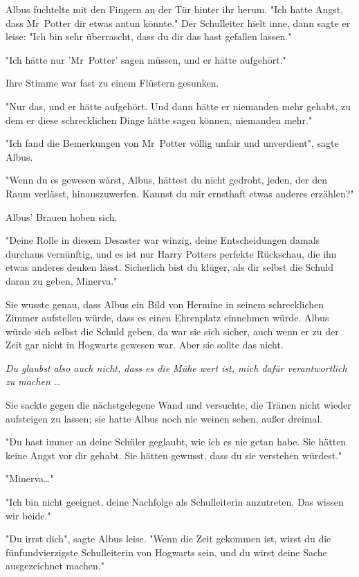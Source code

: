 {Albus fuchtelte mit den Fingern an der Tür hinter ihr herum. "Ich hatte Angst, dass Mr~Potter dir etwas antun könnte." Der Schulleiter hielt inne, dann sagte er leise: "Ich bin sehr überrascht, dass du dir das hast gefallen lassen."

"Ich hätte nur 'Mr~Potter' sagen müssen, und er hätte aufgehört."

Ihre Stimme war fast zu einem Flüstern gesunken.

"Nur das, und er hätte aufgehört. Und dann hätte er niemanden mehr gehabt, zu dem er diese schrecklichen Dinge hätte sagen können, niemanden mehr."

"Ich fand die Bemerkungen von Mr~Potter völlig unfair und unverdient", sagte Albus.

"Wenn du es gewesen wärst, Albus, hättest du nicht gedroht, jeden, der den Raum verlässt, hinauszuwerfen. Kannst du mir ernsthaft etwas anderes erzählen?"

Albus' Brauen hoben sich.

"Deine Rolle in diesem Desaster war winzig, deine Entscheidungen damals durchaus vernünftig, und es ist nur Harry Potters perfekte Rückschau, die ihn etwas anderes denken lässt. Sicherlich bist du klüger, als dir selbst die Schuld daran zu geben, Minerva."

Sie wusste genau, dass Albus ein Bild von Hermine in seinem schrecklichen Zimmer aufstellen würde, dass es einen Ehrenplatz einnehmen würde. Albus würde sich selbst die Schuld geben, da war sie sich sicher, auch wenn er zu der Zeit gar nicht in Hogwarts gewesen war. Aber sie sollte das nicht.

\emph{Du glaubst also auch nicht, dass es die Mühe wert ist, mich dafür verantwortlich zu machen …}

Sie sackte gegen die nächstgelegene Wand und versuchte, die Tränen nicht wieder aufsteigen zu lassen; sie hatte Albus noch nie weinen sehen, außer dreimal.

"Du hast immer an deine Schüler geglaubt, wie ich es nie getan habe. Sie hätten keine Angst vor dir gehabt. Sie hätten gewusst, dass du sie verstehen würdest."

"Minerva…"

"Ich bin nicht geeignet, deine Nachfolge als Schulleiterin anzutreten. Das wissen wir beide."

"Du irrst dich", sagte Albus leise. "Wenn die Zeit gekommen ist, wirst du die fünfundvierzigste Schulleiterin von Hogwarts sein, und du wirst deine Sache ausgezeichnet machen."

}
